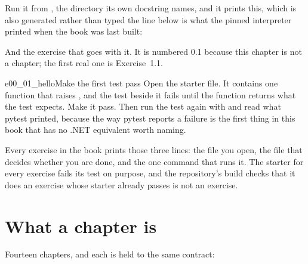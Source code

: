 \noindent
Run it from , the directory its own docstring names, and it
prints this, which is also generated rather than typed \dash{} the line below
is what the pinned interpreter printed when the book was last built:


\noindent
And the exercise that goes with it. It is numbered 0.1 because this chapter
is not a chapter; the first real one is Exercise~1.1.

\begin{exercise}{e00_01_hello}{Make the first test pass}
Open the starter file. It contains one function that raises
, and the test beside it fails until the function
returns what the test expects. Make it pass. Then run the test again with
 and read what pytest printed, because the way pytest reports a
failure is the first thing in this book that has no .NET equivalent worth
naming.
\end{exercise}

\noindent
Every exercise in the book prints those three lines: the file you open, the
file that decides whether you are done, and the one command that runs it. The
starter for every exercise fails its test on purpose, and the repository's
build checks that it does \dash{} an exercise whose starter already passes is
not an exercise.

\section*{What a chapter is}

Fourteen chapters, and each is held to the same contract:

